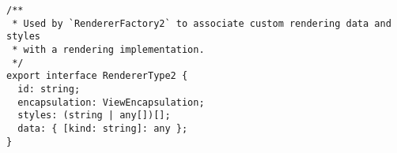 \begin{verbatim}
/**
 * Used by `RendererFactory2` to associate custom rendering data and styles
 * with a rendering implementation.
 */
export interface RendererType2 {
  id: string;
  encapsulation: ViewEncapsulation;
  styles: (string | any[])[];
  data: { [kind: string]: any };
}
\end{verbatim}
